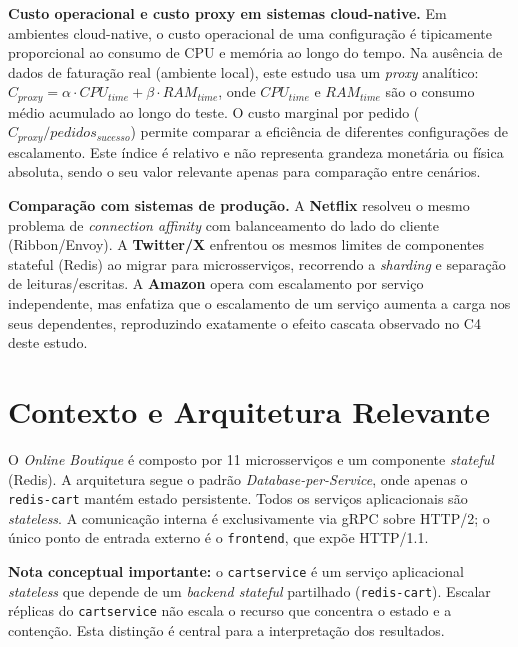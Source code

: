 \documentclass[manuscript,oneside]{acmart}
\begin{document}
\textbf{Custo operacional e custo proxy em sistemas cloud-native.} Em ambientes cloud-native, o custo operacional de uma configuração é tipicamente proporcional ao consumo de CPU e memória ao longo do tempo. Na ausência de dados de faturação real (ambiente local), este estudo usa um \textit{proxy} analítico: $C_{proxy} = \alpha \cdot CPU_{time} + \beta \cdot RAM_{time}$, onde $CPU_{time}$ e $RAM_{time}$ são o consumo médio acumulado ao longo do teste. O custo marginal por pedido ($C_{proxy}/pedidos_{sucesso}$) permite comparar a eficiência de diferentes configurações de escalamento. Este índice é relativo e não representa grandeza monetária ou física absoluta, sendo o seu valor relevante apenas para comparação entre cenários.

\textbf{Comparação com sistemas de produção.} A \textbf{Netflix} resolveu o mesmo problema de \textit{connection affinity} com balanceamento do lado do cliente (Ribbon/Envoy). A \textbf{Twitter/X} enfrentou os mesmos limites de componentes stateful (Redis) ao migrar para microsserviços, recorrendo a \textit{sharding} e separação de leituras/escritas. A \textbf{Amazon} opera com escalamento por serviço independente, mas enfatiza que o escalamento de um serviço aumenta a carga nos seus dependentes, reproduzindo exatamente o efeito cascata observado no C4 deste estudo.

\section{Contexto e Arquitetura Relevante}

O \textit{Online Boutique} é composto por 11 microsserviços e um componente \textit{stateful} (Redis). A arquitetura segue o padrão \textit{Database-per-Service}, onde apenas o \texttt{redis-cart} mantém estado persistente. Todos os serviços aplicacionais são \textit{stateless}. A comunicação interna é exclusivamente via gRPC sobre HTTP/2; o único ponto de entrada externo é o \texttt{frontend}, que expõe HTTP/1.1.

\textbf{Nota conceptual importante:} o \texttt{cartservice} é um serviço aplicacional \textit{stateless} que depende de um \textit{backend stateful} partilhado (\texttt{redis-cart}). Escalar réplicas do \texttt{cartservice} não escala o recurso que concentra o estado e a contenção. Esta distinção é central para a interpretação dos resultados.
\end{document}
